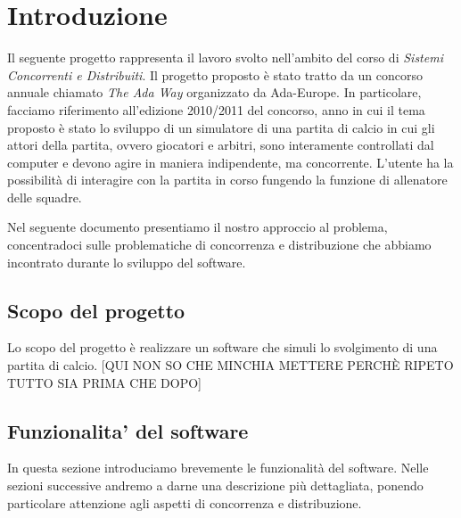 
\section*{Introduzione}
%
\label{sec:introduzione}

Il seguente progetto rappresenta il lavoro svolto nell'ambito del corso di \emph{Sistemi Concorrenti e Distribuiti}. Il progetto proposto \`{e} stato tratto da un concorso annuale chiamato \emph{The Ada Way} organizzato da Ada-Europe. In particolare, facciamo riferimento all'edizione 2010/2011 del concorso, anno in cui il tema proposto \`{e} stato lo sviluppo di un simulatore di una partita di calcio in cui gli attori della partita, ovvero giocatori e arbitri, sono interamente controllati dal computer e devono agire in maniera indipendente, ma concorrente. L'utente ha la possibilit\`{a} di interagire con la partita in corso fungendo la funzione di allenatore delle squadre. 

Nel seguente documento presentiamo il nostro approccio al problema, concentradoci sulle problematiche di concorrenza e distribuzione che abbiamo incontrato durante lo sviluppo del software.

\subsection*{Scopo del progetto}
%
\label{sec:scopo_del_progetto}
Lo scopo del progetto \`{e} realizzare un software che simuli lo svolgimento di una partita di calcio.  [QUI NON SO CHE MINCHIA METTERE PERCH\`{E} RIPETO TUTTO SIA PRIMA CHE DOPO]

\subsection*{Funzionalita' del software}
%
\label{sec:funzionalita_del_software}

In questa sezione introduciamo brevemente le funzionalit\`{a} del software. Nelle sezioni successive andremo a darne una descrizione pi\`{u} dettagliata, ponendo particolare attenzione agli aspetti di concorrenza e distribuzione.

